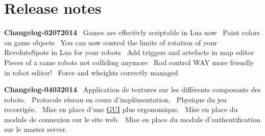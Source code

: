  \hypertarget{index_notes}{}\section{Release notes}\label{index_notes}
{\bfseries Changelog-\/02072014}~\newline
 Games are effectivly scriptable in Lua now~\newline
 Paint colors on game objects~\newline
 You can now control the limits of rotation of your Revolute\+Spots in Lua for your robots~\newline
 Add triggers and artefacts in map editor~\newline
 Pieces of a same robots not colliding anymore~\newline
 Rod control W\+A\+Y more friendly in robot editor!~\newline
 Force and wheights correctly managed~\newline


{\bfseries Changelog-\/04032014}~\newline
 Application de textures sur les différents composants des robots.~\newline
 Protocole réseau en cours d’implémentation.~\newline
 Physique du jeu recorrigée.~\newline
 Mise en place d'une \hyperlink{namespace_g_u_i}{G\+U\+I} plus ergonomique.~\newline
 Mise en place du module de connexion sur le site web.~\newline
 Mise en place du module d'authentification sur le master server.~\newline
 